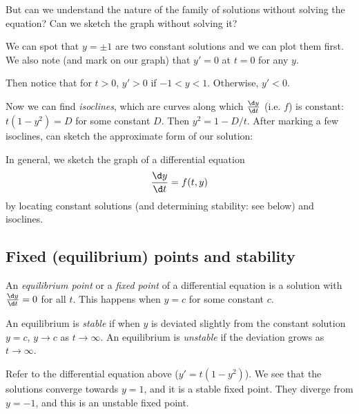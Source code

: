 \documentclass[a4paper]{article}
\begin{document}
But can we understand the nature of the family of solutions without solving the equation? Can we sketch the graph without solving it?

We can spot that $y = \pm 1$ are two constant solutions and we can plot them first. We also note (and mark on our graph) that $y' = 0$ at $t = 0$ for any $y$.

Then notice that for $t > 0$, $y' > 0$ if $-1 < y < 1$. Otherwise, $y' < 0$.

Now we can find \emph{isoclines}, which are curves along which $\frac{\d y}{\d t}$ (i.e. $f$) is constant: $t(1 - y^2) = D$ for some constant $D$. Then $y^2 = 1 - D/t$. After marking a few isoclines, can sketch the approximate form of our solution:


In general, we sketch the graph of a differential equation 
\[
\frac{\d y}{\d t} = f(t, y)
\]
by locating constant solutions (and determining stability: see below) and isoclines.

\subsection{Fixed (equilibrium) points and stability}
\begin{defi}
  An \emph{equilibrium point} or a \emph{fixed point} of a differential equation is a solution with $\frac{\d y}{\d t} = 0$ for all $t$. This happens when $y = c$ for some constant $c$.
\end{defi}

\begin{defi}
  An equilibrium is \emph{stable} if when $y$ is deviated slightly from the constant solution $y = c$, $y \to c$ as $t \to \infty$. An equilibrium is \emph{unstable} if the deviation grows as $t \to \infty$.
\end{defi}

\begin{eg}
  Refer to the differential equation above ($y' = t (1 - y^2)$). We see that the solutions converge towards $y = 1$, and it is a stable fixed point. They diverge from $y = -1$, and this is an unstable fixed point.
\end{eg}
\end{document}
